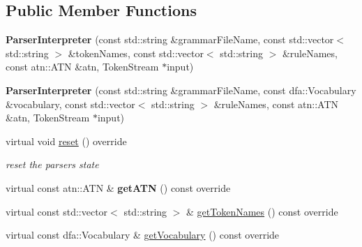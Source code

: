 \subsection*{Public Member Functions}
\begin{DoxyCompactItemize}
\item 
\mbox{\label{classantlr4_1_1ParserInterpreter_a533d22b76ea5f673b1a90bb39c30e43a}} 
{\bfseries Parser\+Interpreter} (const std\+::string \&grammar\+File\+Name, const std\+::vector$<$ std\+::string $>$ \&token\+Names, const std\+::vector$<$ std\+::string $>$ \&rule\+Names, const atn\+::\+A\+TN \&atn, Token\+Stream $\ast$input)
\item 
\mbox{\label{classantlr4_1_1ParserInterpreter_a194d3acdc5d1f127d36747b0306dbf0c}} 
{\bfseries Parser\+Interpreter} (const std\+::string \&grammar\+File\+Name, const dfa\+::\+Vocabulary \&vocabulary, const std\+::vector$<$ std\+::string $>$ \&rule\+Names, const atn\+::\+A\+TN \&atn, Token\+Stream $\ast$input)
\item 
\mbox{\label{classantlr4_1_1ParserInterpreter_a65e201e92ef18a6d9d202938983d940e}} 
virtual void \hyperlink{classantlr4_1_1ParserInterpreter_a65e201e92ef18a6d9d202938983d940e}{reset} () override
\begin{DoxyCompactList}\small\item\em reset the parser\textquotesingle{}s state \end{DoxyCompactList}\item 
\mbox{\label{classantlr4_1_1ParserInterpreter_ab774f28b8ea4caec00a4024acbdf7169}} 
virtual const atn\+::\+A\+TN \& {\bfseries get\+A\+TN} () const override
\item 
virtual const std\+::vector$<$ std\+::string $>$ \& \hyperlink{classantlr4_1_1ParserInterpreter_a8aaa489bc12ef24e3808ecfc41609869}{get\+Token\+Names} () const override
\item 
virtual const dfa\+::\+Vocabulary \& \hyperlink{classantlr4_1_1ParserInterpreter_af8009dbf9445325303ebc59350a7d137}{get\+Vocabulary} () const override
\item 
\mbox{\label{classantlr4_1_1ParserInterpreter_a3af38fde74ad142ef5ca5c1da5a10288}} 

\end{DoxyCompactItemize}
